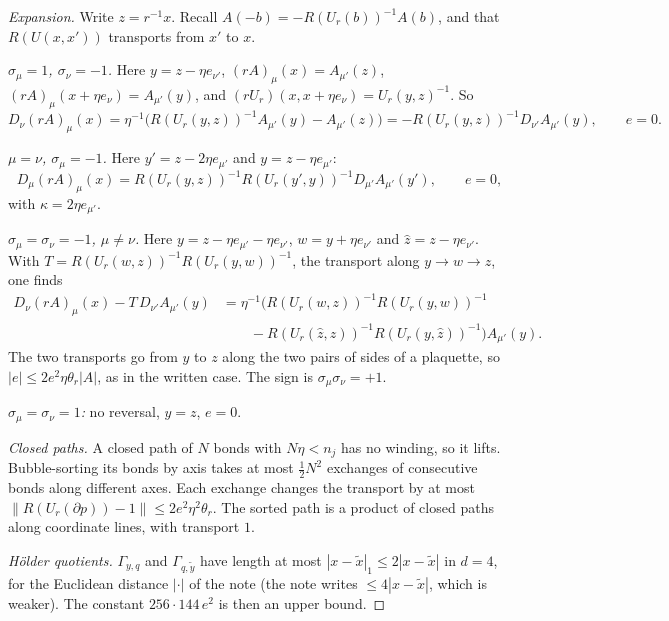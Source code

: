 \begin{proof}[Expansion]
Write $z=r^{-1}x$. Recall $A(-b)=-R(U_r(b))^{-1}A(b)$, and that $R(U(x,x'))$ transports from $x'$ to $x$.

\emph{$\sigma_\mu=1$, $\sigma_\nu=-1$.} Here $y=z-\eta e_{\nu'}$, $(rA)_\mu(x)=A_{\mu'}(z)$, $(rA)_\mu(x+\eta e_\nu)=A_{\mu'}(y)$, and $(rU_r)(x,x+\eta e_\nu)=U_r(y,z)^{-1}$. So
\[
D_\nu(rA)_\mu(x)=\eta^{-1}\big(R(U_r(y,z))^{-1}A_{\mu'}(y)-A_{\mu'}(z)\big)=-R(U_r(y,z))^{-1}D_{\nu'}A_{\mu'}(y),\qquad e=0 .
\]

\emph{$\mu=\nu$, $\sigma_\mu=-1$.} Here $y'=z-2\eta e_{\mu'}$ and $y=z-\eta e_{\mu'}$:
\[
D_\mu(rA)_\mu(x)=R(U_r(y,z))^{-1}R(U_r(y',y))^{-1}D_{\mu'}A_{\mu'}(y'),\qquad e=0,
\]
with $\kappa=2\eta e_{\mu'}$.

\emph{$\sigma_\mu=\sigma_\nu=-1$, $\mu\ne\nu$.} Here $y=z-\eta e_{\mu'}-\eta e_{\nu'}$, $w=y+\eta e_{\nu'}$ and $\hat z=z-\eta e_{\nu'}$. With $T=R(U_r(w,z))^{-1}R(U_r(y,w))^{-1}$, the transport along $y\to w\to z$, one finds
\[
\begin{aligned}
D_\nu(rA)_\mu(x)-T\,D_{\nu'}A_{\mu'}(y)&=\eta^{-1}\Big(R(U_r(w,z))^{-1}R(U_r(y,w))^{-1}\\
&\qquad-R(U_r(\hat z,z))^{-1}R(U_r(y,\hat z))^{-1}\Big)A_{\mu'}(y).
\end{aligned}
\]
The two transports go from $y$ to $z$ along the two pairs of sides of a plaquette, so $|e|\le2e^2\eta\theta_r|A|$, as in the written case. The sign is $\sigma_\mu\sigma_\nu=+1$.

\emph{$\sigma_\mu=\sigma_\nu=1$:} no reversal, $y=z$, $e=0$.

\emph{Closed paths.} A closed path of $N$ bonds with $N\eta<n_j$ has no winding, so it lifts. Bubble-sorting its bonds by axis takes at most $\frac12N^2$ exchanges of consecutive bonds along different axes. Each exchange changes the transport by at most $\|R(U_r(\partial p))-1\|\le2e^2\eta^2\theta_r$. The sorted path is a product of closed paths along coordinate lines, with transport $1$.

\emph{H\"older quotients.} $\Gamma_{y,q}$ and $\Gamma_{q,\tilde y}$ have length at most $|x-\tilde x|_1\le2|x-\tilde x|$ in $d=4$, for the Euclidean distance $|\cdot|$ of the note (the note writes $\le4|x-\tilde x|$, which is weaker). The constant $256\cdot144\,e^2$ is then an upper bound.


\end{proof}
